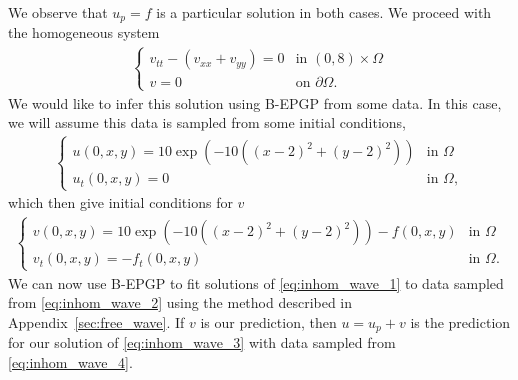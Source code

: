 \documentclass{article} %
\theoremstyle{plain}
\theoremstyle{definition}
\theoremstyle{remark}
\newcommand{\p}{\partial}
\begin{document}
We observe that $u_p=f$ is a particular solution in both cases. We proceed with the homogeneous system
\begin{align}\label{eq:inhom_wave_1}
    \begin{cases}
        v_{tt}-(v_{xx}+v_{yy})=0&\text{in }(0,8)\times\Omega\\
        v=0&\text{on }\p\Omega.
    \end{cases}
\end{align}
We would like to infer this solution using B-EPGP from some data. In this case, we will assume this data is sampled from some initial conditions,
\begin{align}\label{eq:inhom_wave_4}
    \begin{cases}
        u(0,x,y)= 10\exp (-10((x-2)^2+(y-2)^2))&\text{in }\Omega\\
        u_t(0,x,y)= 0&\text{in }\Omega,
    \end{cases}
\end{align}
which then give initial conditions for $v$
\begin{align}\label{eq:inhom_wave_2}
    \begin{cases}
        v(0,x,y)= 10\exp (-10((x-2)^2+(y-2)^2))-f(0,x,y)&\text{in }\Omega\\
        v_t(0,x,y)= -f_t(0,x,y)&\text{in }\Omega.
    \end{cases}
\end{align}
We can now use B-EPGP to fit solutions of \eqref{eq:inhom_wave_1} to data sampled from \eqref{eq:inhom_wave_2} using the method described in Appendix~\ref{sec:free_wave}. If $v$ is our prediction, then $u=u_p+v$ is the prediction for our solution of \eqref{eq:inhom_wave_3} with data sampled from \eqref{eq:inhom_wave_4}.
\end{document}
